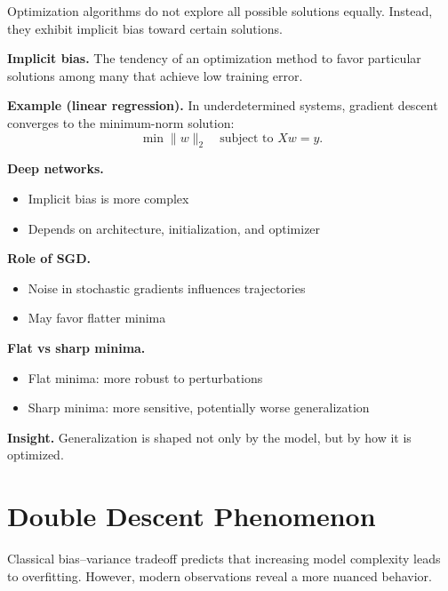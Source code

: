 Optimization algorithms do not explore all possible solutions equally. Instead, they exhibit implicit bias toward certain solutions.

\medskip

\noindent
\textbf{Implicit bias.}  
The tendency of an optimization method to favor particular solutions among many that achieve low training error.

\medskip

\noindent
\textbf{Example (linear regression).}  
In underdetermined systems, gradient descent converges to the minimum-norm solution:
\[
\min \|w\|_2 \quad \text{subject to } Xw = y.
\]

\medskip

\noindent
\textbf{Deep networks.}
\begin{itemize}
    \item Implicit bias is more complex
    \item Depends on architecture, initialization, and optimizer
\end{itemize}

\medskip

\noindent
\textbf{Role of SGD.}
\begin{itemize}
    \item Noise in stochastic gradients influences trajectories
    \item May favor flatter minima
\end{itemize}

\medskip

\noindent
\textbf{Flat vs sharp minima.}
\begin{itemize}
    \item Flat minima: more robust to perturbations
    \item Sharp minima: more sensitive, potentially worse generalization
\end{itemize}

\medskip

\noindent
\textbf{Insight.}  
Generalization is shaped not only by the model, but by how it is optimized.

\section{Double Descent Phenomenon}

Classical bias--variance tradeoff predicts that increasing model complexity leads to overfitting. However, modern observations reveal a more nuanced behavior.

